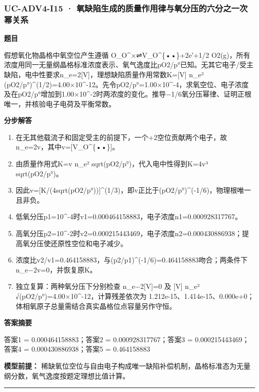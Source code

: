 \documentclass[UTF8,11pt,a4paper]{ctexart}
\begin{document}
\subsubsection*{UC-ADV4-I15 · 氧缺陷生成的质量作用律与氧分压的六分之一次幂关系}
\noindent\textbf{题目}\par
假想氧化物晶格中氧空位产生遵循 O\_O\textasciicircum{}×⇌V\_O\textasciicircum{}\{••\}+2e′+1/2 O2(g)，所有浓度用同一无量纲晶格标准浓度表示、氧气逸度比pO2/p°已知。无其它电子/受主缺陷，电中性要求n\_e=2[V]，理想缺陷质量作用常数K=[V] n\_e² (pO2/p°)\textasciicircum{}(1/2)=4.00×10\textasciicircum{}-12。先令pO2/p°=1.00×10\textasciicircum{}-4，求氧空位、电子浓度及在pO2/p°增加到1.00×10\textasciicircum{}-2时两浓度的变化。推导−1/6氧分压幂律、证明正根唯一，并核验电子电荷及平衡常数。\par
\medskip\noindent\textbf{分步解答}
\begin{enumerate}
\item 在无其他载流子和固定受主的前提下，一个+2空位贡献两个电子，故n\_e=2v，其中v=[V\_O\textasciicircum{}\{••\}]。
\item 由质量作用式K=v n\_e² sqrt(pO2/p°)，代入电中性得到K=4v³ sqrt(pO2/p°)。
\item 因此v=[K/(4sqrt(pO2/p°))]\textasciicircum{}(1/3)，即v正比于(pO2/p°)\textasciicircum{}(-1/6)，物理根唯一且非负。
\item 低氧分压p1=10\textasciicircum{}-4时v1=0.000464158883，电子浓度n1=0.000928317767。
\item 高氧分压p2=10\textasciicircum{}-2时v2=0.000215443469，电子浓度n2=0.000430886938；提高氧分压使还原性空位和电子减少。
\item 浓度比v2/v1=0.464158883，与(p2/p1)\textasciicircum{}(-1/6)=0.464158883吻合；两条件下n\_e−2v=0，并恢复原K。
\item 独立复算：两种氧分压下分别检查 n\_e−2[V]=0 及 [V] n\_e² √(pO2/p°)=4.00×10\textasciicircum{}-12，计算残差依次为 1.212e-15、1.414e-15、0.000e+0；体相氧原子总量需结合真实晶格位点容量另作守恒。
\end{enumerate}
\noindent\textbf{答案摘要}\par
答案1 = 0.000464158883；答案2 = 0.000928317767；答案3 = 0.000215443469；答案4 = 0.000430886938；答案5 = 0.464158883\par
\noindent\textbf{模型前提：}
稀缺氧位空位与自由电子构成唯一缺陷补偿机制，晶格标准态为无量纲分数，氧气逸度按题定理想比值计算。\par
\medskip\hrule\medskip
{}
\end{document}
